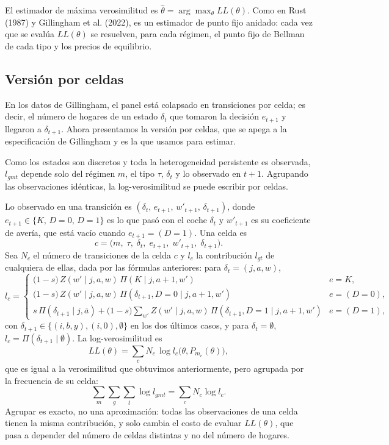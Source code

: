 \documentclass{article}
\begin{document}
El estimador de máxima verosimilitud es $\hat\theta=\arg\max_\theta LL(\theta)$. Como en Rust (1987) y Gillingham et al. (2022), es un estimador de punto fijo anidado: cada vez que se evalúa $LL(\theta)$ se resuelven, para cada régimen, el punto fijo de Bellman de cada tipo y los precios de equilibrio.

\subsection{Versión por celdas}

En los datos de Gillingham, el panel está colapsado en transiciones por celda; es decir, el número de hogares de un estado $\delta_t$ que tomaron la decisión $e_{t+1}$ y llegaron a $\delta_{t+1}$. Ahora presentamos la versión por celdas, que se apega a la especificación de Gillingham y es la que usamos para estimar.

Como los estados son discretos y toda la heterogeneidad persistente es observada, $l_{gmt}$ depende solo del régimen $m$, el tipo $\tau$, $\delta_t$ y lo observado en $t+1$. Agrupando las observaciones idénticas, la log-verosimilitud se puede escribir por celdas.

Lo observado en una transición es $(\delta_t,\,e_{t+1},\,w'_{t+1},\,\delta_{t+1})$, donde $e_{t+1}\in\{K,\,D=0,\,D=1\}$ es lo que pasó con el coche $\delta_t$ y $w'_{t+1}$ es su coeficiente de avería, que está vacío cuando $e_{t+1}=(D=1)$. Una celda es
$$c=\big(m,\;\tau,\;\delta_t,\;e_{t+1},\;w'_{t+1},\;\delta_{t+1}\big).$$
Sea $N_c$ el número de transiciones de la celda $c$ y $l_c$ la contribución $l_{gt}$ de cualquiera de ellas, dada por las fórmulas anteriores: para $\delta_t=(j,a,w)$,
$$l_c=\begin{cases}
\big(1-s\big)\,Z(w'\mid j,a,w)\,\Pi(K\mid j,a+1,w') & e=K,\\[4pt]
\big(1-s\big)\,Z(w'\mid j,a,w)\,\Pi(\delta_{t+1},D=0\mid j,a+1,w') & e=(D=0),\\[4pt]
s\,\Pi(\delta_{t+1}\mid j,\bar{a})+\big(1-s\big)\sum_{w'}Z(w'\mid j,a,w)\,\Pi(\delta_{t+1},D=1\mid j,a+1,w') & e=(D=1),
\end{cases}$$
con $\delta_{t+1}\in\{(i,b,y),(i,0),\emptyset\}$ en los dos últimos casos, y para $\delta_t=\emptyset$, $l_c=\Pi(\delta_{t+1}\mid\emptyset)$. La log-verosimilitud es
$$LL(\theta)=\sum_{c}N_c\,\log l_c\big(\theta,P_{m_c}(\theta)\big),$$
que es igual a la verosimilitud que obtuvimos anteriormente, pero agrupada por la frecuencia de su celda:
$$\sum_{m}\sum_{g}\sum_{t}\log l_{gmt}=\sum_c N_c\log l_c .$$
Agrupar es exacto, no una aproximación: todas las observaciones de una celda tienen la misma contribución, y solo cambia el costo de evaluar $LL(\theta)$, que pasa a depender del número de celdas distintas y no del número de hogares.
\end{document}
